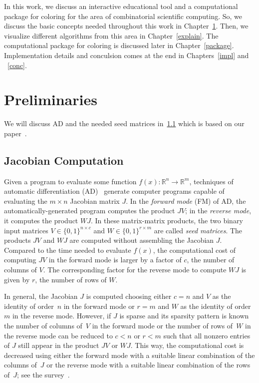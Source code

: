 \documentclass[12pt, oneside]{book}
\newcommand{\setR}{\ensuremath{\mathbb{R}}}
\newcommand{\col}{\ensuremath{c}}
\newcommand{\row}{\ensuremath{r}}
\begin{document}
In this work, we discuss an interactive educational tool and a computational package 
for coloring for the area of combinatorial scientific computing.
So, we discuss the basic concepts needed throughout this work in Chapter~\ref{prel}.
Then, we visualize different algorithms from this area in Chapter~\ref{explain}.
The computational package for coloring is discussed later in Chapter~\ref{package}.
Implementation details and conculsion comes at the end in Chapters~\ref{impl} and
~\ref{conc}.



\chapter{Preliminaries}
\label{prel}
We will discuss AD and the needed seed matrices in~\ref{s.seedmatrix} which is based on
our paper~\cite{2014:09}.
\section{Jacobian Computation}
\label{s.seedmatrix}
Given a program to evaluate some function $f(x) : \setR^n \rightarrow \setR^m$,
techniques of automatic differentiation (AD)~\cite{Griewank2008EDP,Rall1981ADT} generate
computer programs capable of evaluating the $m \times n$ Jacobian matrix $J$. In the
\emph{forward mode} (FM) of AD, the automatically-generated program computes the product
$JV$; in the \emph{reverse mode}, it computes the product $WJ$. In these matrix-matrix
products, the two binary input matrices $V \in \{0,1\}^{n\times \col}$ and $W\in
\{0,1\}^{\row\times m}$ are called \emph{seed matrices}. The products $JV$ and $WJ$ are
computed without assembling the Jacobian $J$. Compared to the time needed to evaluate
$f(x)$, the computational cost of computing $JV$ in the forward mode is larger by a
factor of \col, the number of columns of $V$. The corresponding factor for the reverse
mode to compute $WJ$ is given by \row, the number of rows of $W$.

In general, the Jacobian $J$ is computed choosing either $c=n$ and $V$ as the identity of
order~$n$ in the forward mode or $r = m$ and $W$ as the identity of order $m$ in the
reverse mode. However, if $J$ is sparse and its sparsity pattern is known the number of
columns of~$V$ in the forward mode or the number of rows of~$W$ in the reverse mode can
be reduced to $\col < n$ or $\row < m$ such that all nonzero entries of $J$ still appear
in the product $JV$ or $WJ$. This way, the computational cost is decreased using either
the forward mode with a suitable linear combination of the columns of~$J$ or the reverse
mode with a suitable linear combination of the rows of~$J$; see the
survey~\cite{Gebremedhin05whatcolor}.
\end{document}
